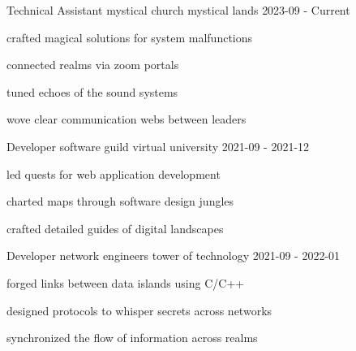 \documentclass[18pt, letterpaper]{awesome-cv}
\begin{document}
\begin{cventries}

\cventry
{Technical Assistant}
{mystical church}
{mystical lands}
{2023-09 - Current} 
{
\begin{cvitems}
    \item{crafted magical solutions for system malfunctions}
    \item{connected realms via zoom portals}
    \item{tuned echoes of the sound systems}
    \item{wove clear communication webs between leaders}
\end{cvitems}
}
\vspace{6mm}
\cventry
{Developer}
{software guild}
{virtual university}
{2021-09 - 2021-12} 
{
\begin{cvitems}
    \item{led quests for web application development}
    \item{charted maps through software design jungles}
    \item{crafted detailed guides of digital landscapes}
\end{cvitems}
}
\vspace{6mm}
\cventry
{Developer}
{network engineers}
{tower of technology}
{2021-09 - 2022-01} 
{
\begin{cvitems}
    \item{forged links between data islands using C/C++}
    \item{designed protocols to whisper secrets across networks}
    \item{synchronized the flow of information across realms}
\end{cvitems}
}
\vspace{6mm}
\end{cventries}
\end{document}
